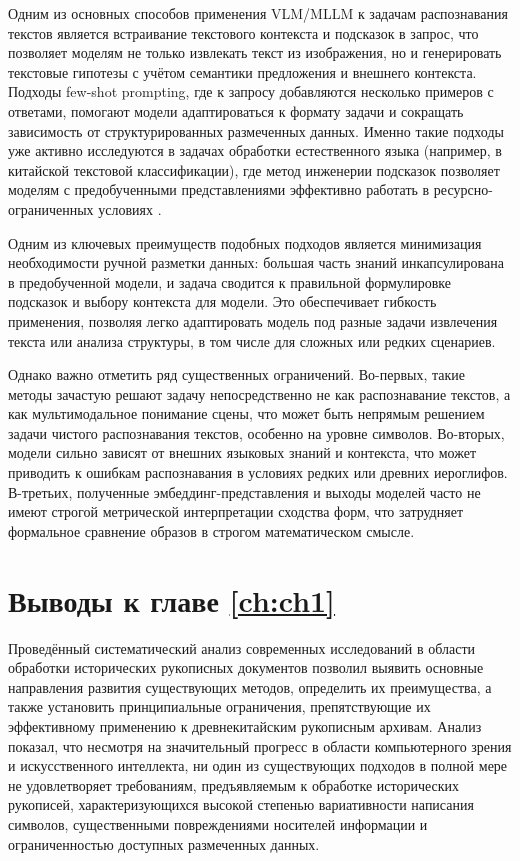 Одним из основных способов применения VLM/MLLM к задачам распознавания текстов является встраивание текстового контекста и подсказок в запрос, что позволяет моделям не только извлекать текст из изображения, но и генерировать текстовые гипотезы с учётом семантики предложения и внешнего контекста. Подходы few-shot prompting, где к запросу добавляются несколько примеров с ответами, помогают модели адаптироваться к формату задачи и сокращать зависимость от структурированных размеченных данных. Именно такие подходы уже активно исследуются в задачах обработки естественного языка (например, в китайской текстовой классификации), где метод инженерии подсказок позволяет моделям с предобученными представлениями эффективно работать в ресурсно-ограниченных условиях \cite{song2022investigating, liu2023hidden}.

Одним из ключевых преимуществ подобных подходов является минимизация необходимости ручной разметки данных: большая часть знаний инкапсулирована в предобученной модели, и задача сводится к правильной формулировке подсказок и выбору контекста для модели. Это обеспечивает гибкость применения, позволяя легко адаптировать модель под разные задачи извлечения текста или анализа структуры, в том числе для сложных или редких сценариев.

Однако важно отметить ряд существенных ограничений. Во-первых, такие методы зачастую решают задачу непосредственно не как распознавание текстов, а как мультимодальное понимание сцены, что может быть непрямым решением задачи чистого распознавания текстов, особенно на уровне символов. Во-вторых, модели сильно зависят от внешних языковых знаний и контекста, что может приводить к ошибкам распознавания в условиях редких или древних иероглифов. В-третьих, полученные эмбеддинг-представления и выходы моделей часто не имеют строгой метрической интерпретации сходства форм, что затрудняет формальное сравнение образов в строгом математическом смысле.

\section{Выводы к главе \ref{ch:ch1}}
Проведённый систематический анализ современных исследований в области обработки исторических рукописных документов позволил выявить основные направления развития существующих методов, определить их преимущества, а также установить принципиальные ограничения, препятствующие их эффективному применению к древнекитайским рукописным архивам. Анализ показал, что несмотря на значительный прогресс в области компьютерного зрения и искусственного интеллекта, ни один из существующих подходов в полной мере не удовлетворяет требованиям, предъявляемым к обработке исторических рукописей, характеризующихся высокой степенью вариативности написания символов, существенными повреждениями носителей информации и ограниченностью доступных размеченных данных.

